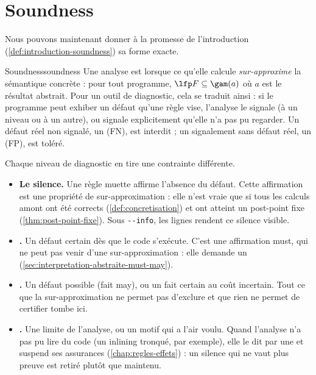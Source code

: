 \section{Soundness}
\label{sec:interpretation-abstraite-soundness}

Nous pouvons maintenant donner à la promesse de l'introduction
(\cref{def:introduction-soundness}) sa forme exacte.

\begin{definition}{Soundness}{soundness}
  Une analyse est  lorsque ce qu'elle calcule
  \emph{sur-approxime} la sémantique concrète : pour tout programme,
  $\lfp F \subseteq \gam(a)$ où $a$ est le résultat abstrait. Pour un outil
  de diagnostic, cela se traduit ainsi : si le programme peut exhiber un
  défaut qu'une règle vise, l'analyse le signale (à un niveau ou à un autre),
  ou signale explicitement qu'elle n'a pas pu regarder. Un défaut réel non
  signalé, un  (FN), est interdit ; un signalement sans
  défaut réel, un  (FP), est toléré.
\end{definition}

Chaque niveau de diagnostic en tire une contrainte différente.

\begin{itemize}
  \item \textbf{Le silence.} Une règle muette affirme l'absence du défaut. Cette
    affirmation est une propriété de sur-approximation : elle n'est vraie que
    si tous les calculs amont ont été corrects (\cref{def:concretisation}) et
    ont atteint un post-point fixe (\cref{thm:post-point-fixe}). Sous
    \texttt{-{}-info}, les lignes  rendent ce silence visible.
  \item \textbf{\Error.} Un défaut certain dès que le code s'exécute. C'est une
    affirmation must, qui ne peut pas venir d'une sur-approximation : elle
    demande un  (\cref{sec:interpretation-abstraite-must-may}).
  \item \textbf{\Warning.} Un défaut possible (fait may), ou un fait certain
    au coût incertain. Tout ce que la sur-approximation ne permet pas
    d'exclure et que rien ne permet de certifier tombe ici.
  \item \textbf{\Info.} Une limite de l'analyse, ou un motif qui a l'air
    voulu. Quand l'analyse n'a pas pu lire du code (un inlining tronqué, par
    exemple), elle le dit par une \Info{} et suspend ses assurances
     (\cref{chap:regles-effets}) : un silence qui ne vaut plus
    preuve est retiré plutôt que maintenu.
\end{itemize}

